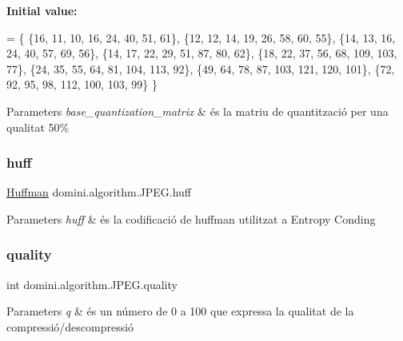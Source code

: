 {\bfseries Initial value\+:}
\begin{DoxyCode}
=
    \{
        \{16, 11, 10, 16, 24, 40, 51, 61\},
        \{12, 12, 14, 19, 26, 58, 60, 55\},
        \{14, 13, 16, 24, 40, 57, 69, 56\},
        \{14, 17, 22, 29, 51, 87, 80, 62\},
        \{18, 22, 37, 56, 68, 109, 103, 77\},
        \{24, 35, 55, 64, 81, 104, 113, 92\},
        \{49, 64, 78, 87, 103, 121, 120, 101\},
        \{72, 92, 95, 98, 112, 100, 103, 99\}
    \}
\end{DoxyCode}

\begin{DoxyParams}{Parameters}
{\em base\+\_\+quantization\+\_\+matrix} & és la matriu de quantització per una qualitat 50\% \\
\hline
\end{DoxyParams}
\mbox{\label{classdomini_1_1algorithm_1_1JPEG_aacc6445baa7819e3f9139ffb78e0b8f4}} 
\subsubsection{\texorpdfstring{huff}{huff}}
{\footnotesize\ttfamily \hyperlink{classHuffman}{Huffman} domini.\+algorithm.\+J\+P\+E\+G.\+huff\hspace{0.3cm}{\ttfamily [package]}}


\begin{DoxyParams}{Parameters}
{\em huff} & és la codificació de huffman utilitzat a Entropy Conding \\
\hline
\end{DoxyParams}
\mbox{\label{classdomini_1_1algorithm_1_1JPEG_ae80176d5ff56e613643db55e21c513da}} 
\subsubsection{\texorpdfstring{quality}{quality}}
{\footnotesize\ttfamily int domini.\+algorithm.\+J\+P\+E\+G.\+quality\hspace{0.3cm}{\ttfamily [private]}}


\begin{DoxyParams}{Parameters}
{\em q} & és un número de 0 a 100 que expressa la qualitat de la compressió/descompressió \\
\hline
\end{DoxyParams}
\mbox{\label{classdomini_1_1algorithm_1_1JPEG_a7c95eb140dbe185a31b402d48ec17a66}} 
